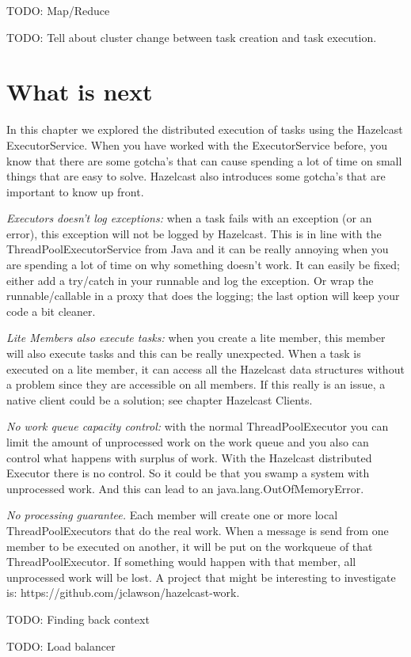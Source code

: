 TODO: Map/Reduce

TODO: Tell about cluster change between task creation and task execution.

\section{What is next}
In this chapter we explored the distributed execution of tasks using the Hazelcast ExecutorService. When you have worked with the ExecutorService before, you know that there are some gotcha's that can cause spending a lot of time on small things that are easy to solve. Hazelcast also introduces some gotcha's that are important to know up front.

\emph{Executors doesn't log exceptions:} when a task fails with an exception (or an error), this exception will not be logged by Hazelcast. This is in line with the ThreadPoolExecutorService from Java and it can be really annoying when you are spending a lot of time on why something doesn't work. It can easily be fixed; either add a try/catch in your runnable and log the exception. Or wrap the runnable/callable in a proxy that does the logging; the last option will keep your code a bit cleaner. 

\emph{Lite Members also execute tasks:} when you create a lite member, this member will also execute tasks and this can be really unexpected. When a task is executed on a lite member, it can access all the Hazelcast data structures without a problem since they are accessible on all members. If this really is an issue, a native client could be a solution; see chapter Hazelcast Clients.

\emph{No work queue capacity control:} with the normal ThreadPoolExecutor you can limit the amount of unprocessed work on the work queue and you also can control what happens with surplus of work. With the Hazelcast distributed Executor there is no control. So it could be that you swamp a system with unprocessed work. And this can lead to an java.lang.OutOfMemoryError.

\emph{No processing guarantee.} Each member will create one or more local ThreadPoolExecutors that do the real work. When a message is send from one member to be executed on another, it will be put on the workqueue of that ThreadPoolExecutor. If something would happen with that member, all unprocessed work will be lost. A project that might be interesting to investigate is: https://github.com/jclawson/hazelcast-work.

TODO: Finding back context

TODO: Load balancer

